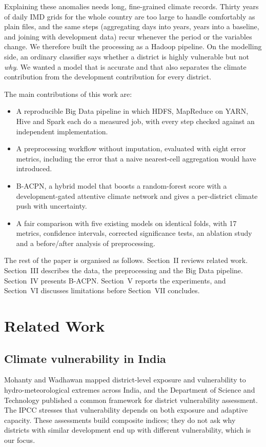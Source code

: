\documentclass[conference]{IEEEtran}
\begin{document}
Explaining these anomalies needs long, fine-grained climate records. Thirty years of daily IMD grids \cite{pai2014,srivastava2009} for the whole country are too large to handle comfortably as plain files, and the same steps (aggregating days into years, years into a baseline, and joining with development data) recur whenever the period or the variables change. We therefore built the processing as a Hadoop pipeline. On the modelling side, an ordinary classifier says whether a district is highly vulnerable but not \emph{why}. We wanted a model that is accurate and that also separates the climate contribution from the development contribution for every district.

The main contributions of this work are:
\begin{itemize}
\item A reproducible Big Data pipeline in which HDFS, MapReduce on YARN, Hive and Spark each do a measured job, with every step checked against an independent implementation.
\item A preprocessing workflow without imputation, evaluated with eight error metrics, including the error that a naive nearest-cell aggregation would have introduced.
\item B-ACPN, a hybrid model that boosts a random-forest score with a development-gated attentive climate network and gives a per-district climate push with uncertainty.
\item A fair comparison with five existing models on identical folds, with 17 metrics, confidence intervals, corrected significance tests, an ablation study and a before/after analysis of preprocessing.
\end{itemize}

The rest of the paper is organised as follows. Section~II reviews related work. Section~III describes the data, the preprocessing and the Big Data pipeline. Section~IV presents B-ACPN. Section~V reports the experiments, and Section~VI discusses limitations before Section~VII concludes.

\section{Related Work}
\subsection{Climate vulnerability in India}
Mohanty and Wadhawan \cite{ceew2021} mapped district-level exposure and vulnerability to hydro-meteorological extremes across India, and the Department of Science and Technology \cite{dst2020} published a common framework for district vulnerability assessment. The IPCC \cite{ipcc2022} stresses that vulnerability depends on both exposure and adaptive capacity. These assessments build composite indices; they do not ask why districts with similar development end up with different vulnerability, which is our focus.
\end{document}

